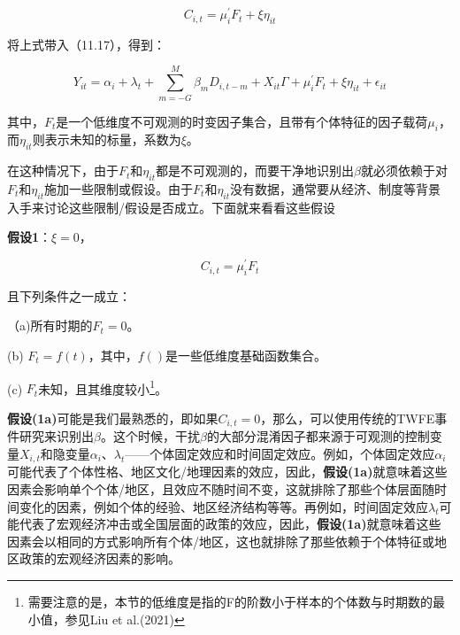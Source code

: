 \documentclass[cn,12pt,math=newtx,citestyle=gb7714-2015,bibstyle=gb7714-2015]{elegantbook}
\begin{document}
	$$C_{i,t}=\mu_i^{'}F_t+\xi \eta_{it}$$
	
	将上式带入（11.17），得到：
	
	\begin{equation}
		Y_{it}=\alpha_i+\lambda_t+\sum_{m=-G}^M \beta_m D_{i,t-m}+ X_{it}\Gamma +\mu_i^{'}F_t+\xi \eta_{it}   +\epsilon_{it}
	\end{equation}
	
	其中，$F_t$是一个低维度不可观测的时变因子集合，且带有个体特征的因子载荷$\mu_i$，而$\eta_{it} $则表示未知的标量，系数为$\xi$。
	
	在这种情况下，由于$F_t$和$\eta_{it}$都是不可观测的，而要干净地识别出$\beta$就必须依赖于对$F_t$和$\eta_{it}$施加一些限制或假设。由于$F_t$和$\eta_{it}$没有数据，通常要从经济、制度等背景入手来讨论这些限制/假设是否成立。下面就来看看这些假设
	
	\textbf{假设1}：$\xi=0$，
		
		$$C_{i,t}=\mu_i^{'}F_t$$
		
		且下列条件之一成立：
	
	（a)所有时期的$F_t=0$。
	
	(b) $F_t=f(t)$，其中，$f()$是一些低维度基础函数集合。
	
	(c) $F_t$未知，且其维度较小\footnote{需要注意的是，本节的低维度是指的F的阶数小于样本的个体数与时期数的最小值，参见Liu et al.(2021)}。
	
	\textbf{假设(1a)}可能是我们最熟悉的，即如果$C_{i,t}=0$，那么，可以使用传统的TWFE事件研究来识别出$\beta$。这个时候，干扰$\beta$的大部分混淆因子都来源于可观测的控制变量$X_{i,t}$和隐变量$\alpha_i$、$\lambda_t$——个体固定效应和时间固定效应。例如，个体固定效应$\alpha_i$可能代表了个体性格、地区文化/地理因素的效应，因此，\textbf{假设(1a)}就意味着这些因素会影响单个个体/地区，且效应不随时间不变，这就排除了那些个体层面随时间变化的因素，例如个体的经验、地区经济结构等等。再例如，时间固定效应$\lambda_t$可能代表了宏观经济冲击或全国层面的政策的效应，因此，\textbf{假设(1a)}就意味着这些因素会以相同的方式影响所有个体/地区，这也就排除了那些依赖于个体特征或地区政策的宏观经济因素的影响。
	
\end{document}
